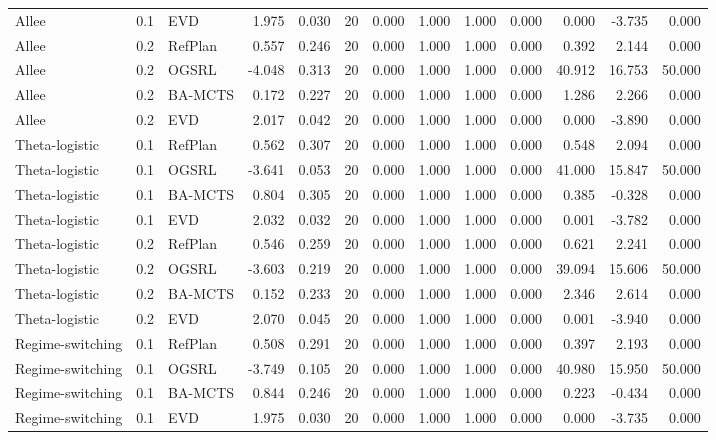 \documentclass[10pt]{article}
\begin{document}
\begin{landscape}
\begin{center}
\begin{longtable}{@{}lllr@{}r@{}r@{}rrrrrrr@{}}
Allee & 0.1 & EVD & 1.975 & 0.030 & 20 & 0.000 & 1.000 & 1.000 & 0.000 & 0.000 & -3.735 & 0.000 \\
\addlinespace[1.5pt]
Allee & 0.2 & RefPlan & 0.557 & 0.246 & 20 & 0.000 & 1.000 & 1.000 & 0.000 & 0.392 & 2.144 & 0.000 \\
Allee & 0.2 & OGSRL & -4.048 & 0.313 & 20 & 0.000 & 1.000 & 1.000 & 0.000 & 40.912 & 16.753 & 50.000 \\
Allee & 0.2 & BA-MCTS & 0.172 & 0.227 & 20 & 0.000 & 1.000 & 1.000 & 0.000 & 1.286 & 2.266 & 0.000 \\
Allee & 0.2 & EVD & 2.017 & 0.042 & 20 & 0.000 & 1.000 & 1.000 & 0.000 & 0.000 & -3.890 & 0.000 \\
\addlinespace[1.5pt]
Theta-logistic & 0.1 & RefPlan & 0.562 & 0.307 & 20 & 0.000 & 1.000 & 1.000 & 0.000 & 0.548 & 2.094 & 0.000 \\
Theta-logistic & 0.1 & OGSRL & -3.641 & 0.053 & 20 & 0.000 & 1.000 & 1.000 & 0.000 & 41.000 & 15.847 & 50.000 \\
Theta-logistic & 0.1 & BA-MCTS & 0.804 & 0.305 & 20 & 0.000 & 1.000 & 1.000 & 0.000 & 0.385 & -0.328 & 0.000 \\
Theta-logistic & 0.1 & EVD & 2.032 & 0.032 & 20 & 0.000 & 1.000 & 1.000 & 0.000 & 0.001 & -3.782 & 0.000 \\
\addlinespace[1.5pt]
Theta-logistic & 0.2 & RefPlan & 0.546 & 0.259 & 20 & 0.000 & 1.000 & 1.000 & 0.000 & 0.621 & 2.241 & 0.000 \\
Theta-logistic & 0.2 & OGSRL & -3.603 & 0.219 & 20 & 0.000 & 1.000 & 1.000 & 0.000 & 39.094 & 15.606 & 50.000 \\
Theta-logistic & 0.2 & BA-MCTS & 0.152 & 0.233 & 20 & 0.000 & 1.000 & 1.000 & 0.000 & 2.346 & 2.614 & 0.000 \\
Theta-logistic & 0.2 & EVD & 2.070 & 0.045 & 20 & 0.000 & 1.000 & 1.000 & 0.000 & 0.001 & -3.940 & 0.000 \\
\addlinespace[1.5pt]
Regime-switching & 0.1 & RefPlan & 0.508 & 0.291 & 20 & 0.000 & 1.000 & 1.000 & 0.000 & 0.397 & 2.193 & 0.000 \\
Regime-switching & 0.1 & OGSRL & -3.749 & 0.105 & 20 & 0.000 & 1.000 & 1.000 & 0.000 & 40.980 & 15.950 & 50.000 \\
Regime-switching & 0.1 & BA-MCTS & 0.844 & 0.246 & 20 & 0.000 & 1.000 & 1.000 & 0.000 & 0.223 & -0.434 & 0.000 \\
Regime-switching & 0.1 & EVD & 1.975 & 0.030 & 20 & 0.000 & 1.000 & 1.000 & 0.000 & 0.000 & -3.735 & 0.000 \\

\end{longtable}
\end{center}
\end{landscape}
\end{document}
